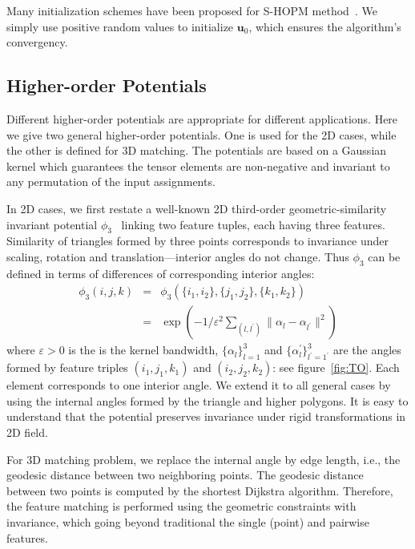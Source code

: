 Many initialization schemes have been proposed for S-HOPM method~\cite{Kofidis02}.
We simply use positive random values to initialize $\boldsymbol{u}_0$, which ensures the algorithm's convergency.

\subsection{Higher-order Potentials}
\label{subsec:potentials}

Different higher-order potentials are appropriate for different applications.
Here we give two general higher-order potentials.
One is used for the 2D cases, while the other is defined for 3D matching.
The potentials are based on a Gaussian kernel which guarantees the tensor elements are non-negative and invariant to any permutation of the input assignments.

In 2D cases, we first restate a well-known 2D third-order geometric-similarity invariant potential $\phi_3$~\cite{Duchenne09,Chertok10} linking two feature tuples,
each having three features.
Similarity of triangles formed by three points corresponds to invariance under scaling, rotation and translation---interior angles do not change.
Thus $\phi_3$ can be defined in terms of differences of corresponding interior angles:
\begin{eqnarray}
\phi_3(i,j,k)&=&\phi_3(\{i_1,i_2\}, \{j_1,j_2\}, \{k_1,k_2\})\nonumber\\
&=&\exp(-1/\varepsilon^2\sum\nolimits_{(l,l^{'})}\lVert \alpha_l- \alpha_{l^{'} } \lVert^2 )
\end{eqnarray}
where $\varepsilon > 0$ is the is the kernel bandwidth,
$\{\alpha_l\}_{l=1}^3$ and $\{\alpha_l^{'}\}_{l^{'}=1^{'}}^{3}$ are the angles formed by feature triples $(i_1,j_1,k_1)$ and $(i_2,j_2,k_2)$:
see figure~\ref{fig:TO}. Each element corresponds to one interior angle.
We extend it to all general cases by using the internal angles formed by the triangle and higher polygons.
It is easy to understand that the potential preserves invariance under rigid transformations in 2D field.

For 3D matching problem, we replace the internal angle by edge length, i.e., the geodesic distance between two neighboring points.
The geodesic distance~\cite{Peyre2010} between two points is computed by the shortest Dijkstra algorithm. 
Therefore, the feature matching is performed using the geometric constraints with invariance,
which going beyond traditional the single (point) and pairwise features.


